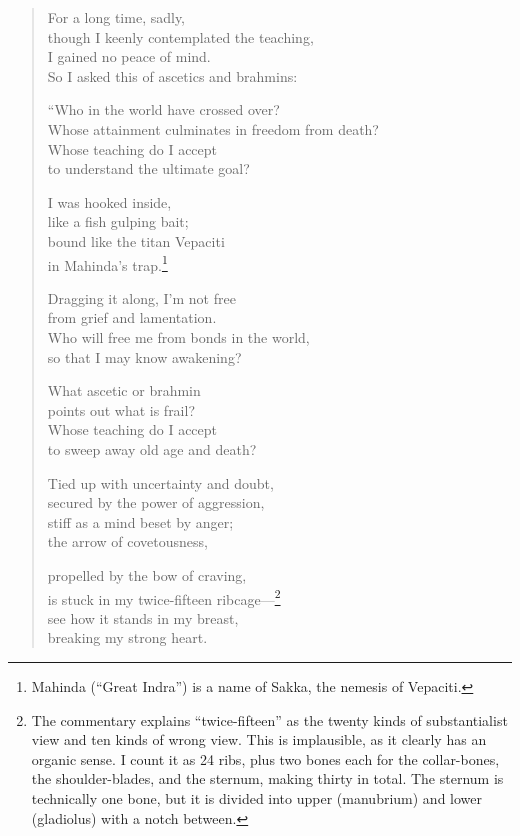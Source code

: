 \documentclass[12pt,openany]{book}%
\begin{document}
\begin{verse}%
For a long time, sadly, \\
though I keenly contemplated the teaching, \\
I gained no peace of mind. \\
So I asked this of ascetics and brahmins: 

“Who in the world have crossed over? \\
Whose attainment culminates in freedom from death? \\
Whose teaching do I accept \\
to understand the ultimate goal? 

I was hooked inside, \\
like a fish gulping bait; \\
bound like the titan Vepaciti \\
in Mahinda’s trap.\footnote{Mahinda (“Great Indra”) is a name of Sakka, the nemesis of Vepaciti. } 

Dragging it along, I’m not free \\
from grief and lamentation. \\
Who will free me from bonds in the world, \\
so that I may know awakening? 

What ascetic or brahmin \\
points out what is frail? \\
Whose teaching do I accept \\
to sweep away old age and death? 

Tied up with uncertainty and doubt, \\
secured by the power of aggression, \\
stiff as a mind beset by anger; \\
the arrow of covetousness, 

propelled by the bow of craving, \\
is stuck in my twice-fifteen ribcage—\footnote{The commentary explains “twice-fifteen” as the twenty kinds of substantialist view and ten kinds of wrong view. This is implausible, as it clearly has an organic sense. I count it as 24 ribs, plus two bones each for the collar-bones, the shoulder-blades, and the sternum, making thirty in total. The sternum is technically one bone, but it is divided into upper (manubrium) and lower (gladiolus) with a notch between. } \\
see how it stands in my breast, \\
breaking my strong heart. 


\end{verse}
\end{document}
